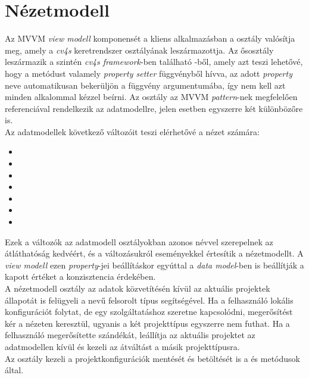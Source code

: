 \section{Nézetmodell}

Az MVVM \emph{view modell} komponensét a kliens alkalmazásban a  osztály valósítja meg, amely a \emph{cv4s} keretrendszer  osztályának leszármazottja. Az ősosztály leszármazik a szintén \emph{cv4s framework}-ben található -ből, amely azt teszi lehetővé, hogy a  metódust valamely \emph{property setter} függvényből hívva, az adott \emph{property} neve automatikusan bekerüljön a függvény argumentumába, így nem kell azt minden alkalommal kézzel beírni. Az osztály az MVVM \emph{pattern}-nek megfelelően referenciával rendelkezik az adatmodellre, jelen esetben egyszerre két különbözőre is.\\
Az adatmodellek következő változóit teszi elérhetővé a nézet számára:

 \begin{multicols}{2}
    \begin{itemize}
        \item {}
        \item {}
        \item {}
        \item {}
        \item {}
        \item {}
        \item {}
    \end{itemize}
    \end{multicols}

Ezek a változók az adatmodell osztályokban azonos névvel szerepelnek az átláthatóság kedvéért, és a változásukról eseményekkel értesítik a nézetmodellt. A \emph{view modell} ezen \emph{property}-jei beállításkor egyúttal a \emph{data model}-ben is beállítják a kapott értéket a konzisztencia érdekében.\\
A nézetmodell osztály az adatok közvetítésén kívül az aktuális projektek állapotát is felügyeli a  nevű felsorolt típus segítségével. Ha a felhasználó lokális konfigurációt folytat, de egy szolgáltatáshoz szeretne kapcsolódni, megerősítést kér a nézeten keresztül, ugyanis a két projekttípus egyszerre nem futhat. Ha a felhasználó megerősítette szándékát, leállítja az aktuális projektet az adatmodellen kívül és kezeli az átváltást a másik projekttípusra.\\
Az osztály kezeli a projektkonfigurációk mentését és betöltését is a  és  metódusok által.

